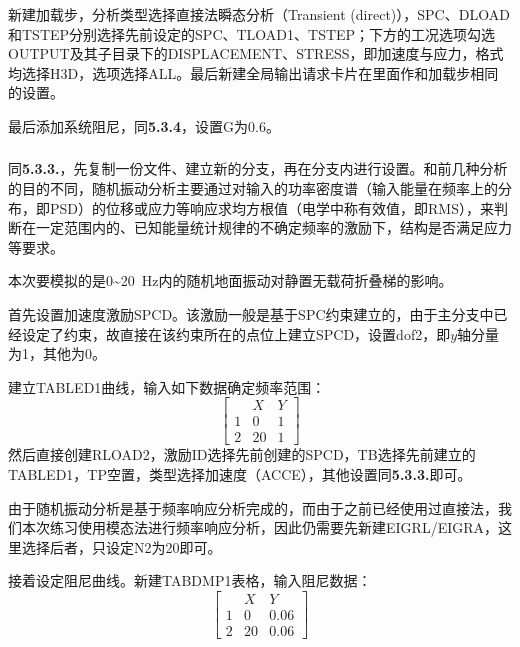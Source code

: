 \documentclass[12pt, oneside, a4paper]{ctexart}
\begin{document}
\subsubsection{}
\par{}
新建加载步，分析类型选择直接法瞬态分析（Transient (direct)），SPC、DLOAD和TSTEP分别选择先前设定的SPC、TLOAD1、TSTEP；下方的工况选项勾选OUTPUT及其子目录下的DISPLACEMENT、STRESS，即加速度与应力，格式均选择H3D，选项选择ALL。最后新建全局输出请求卡片在里面作和加载步相同的设置。
\par{}
最后添加系统阻尼，同\textbf{5.3.4}，设置G为0.6。
\subsubsection{}
\par{}
同\textbf{5.3.3.}，先复制一份文件、建立新的分支，再在分支内进行设置。和前几种分析的目的不同，随机振动分析主要通过对输入的功率密度谱（输入能量在频率上的分布，即PSD）的位移或应力等响应求均方根值（电学中称有效值，即RMS），来判断在一定范围内的、已知能量统计规律的不确定频率的激励下，结构是否满足应力等要求。
\par{}
本次要模拟的是0\textasciitilde20~Hz内的随机地面振动对静置无载荷折叠梯的影响。
\par{}
首先设置加速度激励SPCD。该激励一般是基于SPC约束建立的，由于主分支中已经设定了约束，故直接在该约束所在的点位上建立SPCD，设置dof2，即$y$轴分量为1，其他为0。
\par{}
建立TABLED1曲线，输入如下数据确定频率范围：
\begin{equation*}
    \begin{bmatrix}
          & X  & Y \\
        1 & 0  & 1 \\
        2 & 20 & 1
    \end{bmatrix}
\end{equation*}
然后直接创建RLOAD2，激励ID选择先前创建的SPCD，TB选择先前建立的TABLED1，TP空置，类型选择加速度（ACCE），其他设置同\textbf{5.3.3.}即可。
\par{}
由于随机振动分析是基于频率响应分析完成的，而由于之前已经使用过直接法，我们本次练习使用模态法进行频率响应分析，因此仍需要先新建EIGRL/EIGRA，这里选择后者，只设定N2为20即可。
\par{}
接着设定阻尼曲线。新建TABDMP1表格，输入阻尼数据：
\begin{equation*}
    \begin{bmatrix}
          & X  & Y    \\
        1 & 0  & 0.06 \\
        2 & 20 & 0.06
    \end{bmatrix}
\end{equation*}
\end{document}
